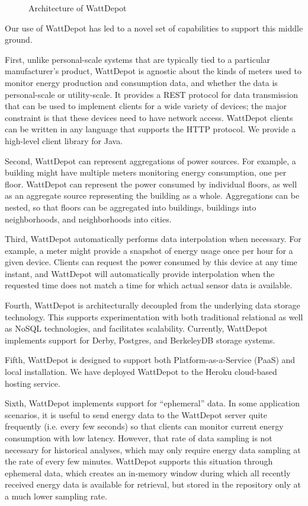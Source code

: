 \documentclass{acm_proc_article-sp}
\begin{document}
\begin{figure}
\begin{center}
\end{center}
\caption{Architecture of WattDepot}
\label{fig:wattdepot}
\end{figure}

Our use of WattDepot has led to a novel set of capabilities to support
this middle ground.

First, unlike personal-scale systems that are typically tied to a particular
manufacturer's product, WattDepot is agnostic about the kinds of meters used to monitor
energy production and consumption data, and whether the data is personal-scale or
utility-scale. It provides a REST protocol for data transmission that can be used to
implement clients for a wide variety of devices; the major constraint is that these
devices need to have network access. WattDepot clients can be written in any language
that supports the HTTP protocol. We provide a high-level client library for Java.

Second, WattDepot can represent aggregations of power sou\-rces. For example, a building
might have multiple meters monitoring energy consumption, one per floor. WattDepot can
represent the power consumed by individual floors, as well as an aggregate source
representing the building as a whole. Aggregations can be nested, so that floors can be
aggregated into buildings, buildings into neighborhoods, and neighborhoods into cities.

Third, WattDepot automatically performs data interpolation when necessary. For example, a
meter might provide a snapshot of energy usage once per hour for a given device. Clients
can request the power consumed by this device at any time instant, and WattDepot will
automatically provide interpolation when the requested time does not match a time for
which actual sensor data is available.

Fourth, WattDepot is architecturally decoupled from the underlying data storage
technology. This supports experimentation with both traditional relational as well as
NoSQL technologies, and facilitates scalability. Currently, WattDepot implements support
for Derby, Postgres, and BerkeleyDB storage systems.

Fifth, WattDepot is designed to support both Platform-as-a-Service (PaaS) and local
installation. We have deployed WattDepot to the Heroku cloud-based hosting service.

Sixth, WattDepot implements support for ``ephemeral'' data. In some application scenarios,
it is useful to send energy data to the WattDepot server quite frequently (i.e. every few
seconds) so that clients can monitor current energy consumption with low latency. However,
that rate of data sampling is not necessary for historical analyses, which may only
require energy data sampling at the rate of every few minutes. WattDepot supports this
situation through ephemeral data, which creates an in-memory window during which all
recently received energy data is available for retrieval, but stored in the repository
only at a much lower sampling rate.
\end{document}
